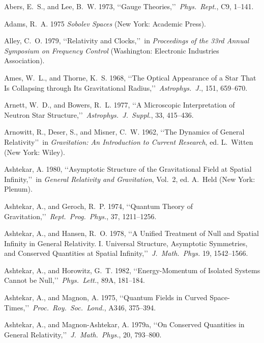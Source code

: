 
\item Abers, E.~S., and Lee, B.~W. 1973, \lq\lq Gauge Theories,\rq\rq\ \emph{Phys.\ Rept.}, C9, 1--141.
\item Adams, R.~A. 1975 \emph{Sobolev Spaces} (New York: Academic Press).
\item Alley, C.~O. 1979, \lq\lq Relativity and Clocks,\rq\rq\ in \emph{Proceedings of the 33rd Annual Symposium on Frequency Control} (Washington: Electronic Industries Association).
\item Ames, W.~L., and Thorne, K.~S. 1968, \lq\lq The Optical Appearance of a Star That Is Collapsing through Its Gravitational Radius,\rq\rq\ \emph{Astrophys.\ J.}, 151, 659--670.
\item Arnett, W.~D., and Bowers, R.~L. 1977, \lq\lq A Microscopic Interpretation of Neutron Star Structure,\rq\rq\ \emph{Astrophys.\ J.\ Suppl.}, 33, 415--436.
\item Arnowitt, R., Deser, S., and Misner, C.~W. 1962, \lq\lq The Dynamics of General Relativity\rq\rq\ in \emph{Gravitation: An Introduction to Current Research}, ed. L.~Witten (New York: Wiley).
\item Ashtekar, A. 1980, \lq\lq Asymptotic Structure of the Gravitational Field at Spatial Infinity,\rq\rq\ in \emph{General Relativity and Gravitation}, Vol.~2, ed. A.~Held (New York: Plenum).
\item Ashtekar, A., and Geroch, R.~P. 1974, \lq\lq Quantum Theory of Gravitation,\rq\rq\ \emph{Rept.\ Prog.\ Phys.}, 37, 1211--1256.
\item Ashtekar, A., and Hansen, R.~O. 1978, \lq\lq A Unified Treatment of Null and Spatial Infinity in General Relativity. I. Universal Structure, Asymptotic Symmetries, and Conserved Quantities at Spatial Infinity,\rq\rq\ \emph{J.\ Math.\ Phys.} 19, 1542--1566.
\item Ashtekar, A., and Horowitz, G.~T. 1982, \lq\lq Energy-Momentum of Isolated Systems Cannot be Null,\rq\rq\ \emph{Phys.\ Lett.}, 89A, 181--184.
\item Ashtekar, A., and Magnon, A. 1975, \lq\lq Quantum Fields in Curved Space-Times,\rq\rq\ \emph{Proc.\ Roy.\ Soc.\ Lond.}, A346, 375--394.
\item Ashtekar, A., and Magnon-Ashtekar, A. 1979a, \lq\lq On Conserved Quantities in General Relativity,\rq\rq\ \emph{J.\ Math.\ Phys.}, 20, 793--800.
